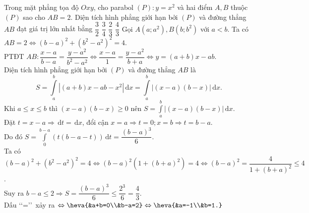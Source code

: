 \begin{ex}%
Trong mặt phẳng tọa độ $Oxy$, cho parabol $(P)\colon y =x^2$ và hai điểm $A, B$ thuộc $(P)$ sao cho
$AB= 2$. Diện tích hình phẳng giới hạn bởi $(P)$ và đường thẳng $AB$ đạt giá trị lớn nhất bằng
\choice
{$\dfrac{3}{2}$}
{$\dfrac{3}{4}$}
{$\dfrac{2}{3}$}
{\True $\dfrac{4}{3}$}
\loigiai
{Gọi $A(a;a^2), B(b;b^2)$ với $a<b$. Ta có $AB=2\Leftrightarrow (b-a)^2+(b^2-a^2)^2=4$.\\
PTĐT $AB\colon\dfrac{x-a}{b-a}=\dfrac{y-a^2}{b^2-a^2}\Leftrightarrow\dfrac{x-a}{1}=\dfrac{y-a^2}{b+a}\Leftrightarrow y = (a+b)x-ab.$\\
Diện tích hình phẳng giới hạn bởi $(P)$ và đường thẳng $AB$ là
$$S= \displaystyle\int\limits_a^b |(a+b)x-ab-x^2|\mathrm{\,d}x = \displaystyle\int\limits_a^b |(x-a)(b-x)|\mathrm{\,d}x.$$
Khi $a\leq x \leq b$ thì $(x-a)(b-x)\geq 0$ nên $S= \displaystyle\int\limits_a^b |(x-a)(b-x)|\mathrm{\,d}x$. \\
Đặt $t = x-a\Rightarrow \mathrm{\,d}t=\mathrm{\,d}x$, đổi cận $x=a\Rightarrow t=0; x=b \Rightarrow t = b-a$.\\
Do đó $S= \displaystyle\int\limits_0^{b-a} \left(t(b-a-t)\right)\mathrm{\,d}t=\dfrac{(b-a)^3}{6}.$\\
Ta có $(b-a)^2+(b^2-a^2)^2=4\Leftrightarrow(b-a)^2(1+(b+a)^2)=4\Leftrightarrow(b-a)^2=\dfrac{4}{1+(b+a)^2}\leq 4$.\\
Suy ra $b-a \leq 2 \Rightarrow S = \dfrac{(b-a)^3}{6}\leq \dfrac{2^3}{6}=\dfrac{4}{3}.$\\
Dấu \lq\lq =\rq\rq\, xảy ra $\Leftrightarrow\heva{&a+b=0\\&b-a=2}\Leftrightarrow \heva{&a=-1\\&b=1.}$
}
\end{ex}

